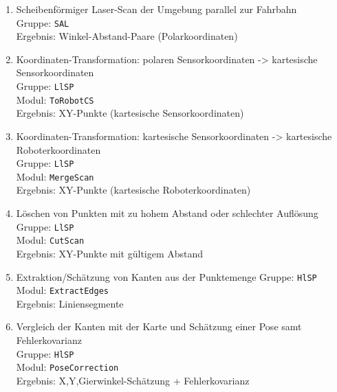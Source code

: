 \begin{enumerate}
  \item Scheibenförmiger Laser-Scan der Umgebung parallel zur Fahrbahn\\
    	Gruppe: \lstinline{SAL}\\
    	Ergebnis: Winkel-Abstand-Paare (Polarkoordinaten)\\
  \item Koordinaten-Transformation: polaren Sensorkoordinaten -> kartesische
  		Sensorkoordinaten\\
  		Gruppe: \lstinline{LlSP}\\
    	Modul: \lstinline{ToRobotCS}\\
    	Ergebnis: XY-Punkte (kartesische Sensorkoordinaten)\\
  \item Koordinaten-Transformation: kartesische Sensorkoordinaten -> kartesische
  		Roboterkoordinaten\\ 
  		Gruppe: \lstinline{LlSP}\\
  		Modul: \lstinline{MergeScan}\\
  		Ergebnis: XY-Punkte (kartesische Roboterkoordinaten)\\
  \item Löschen von Punkten mit zu hohem Abstand oder schlechter Auflösung\\
    	Gruppe: \lstinline{LlSP}\\
    	Modul: \lstinline{CutScan}\\
    	Ergebnis: XY-Punkte mit gültigem Abstand\\
  \item Extraktion/Schätzung von Kanten aus der Punktemenge
    	Gruppe: \lstinline{HlSP}\\
    	Modul: \lstinline{ExtractEdges}\\
    	Ergebnis: Liniensegmente\\
  \item Vergleich der Kanten mit der Karte und Schätzung einer Pose samt
  		Fehlerkovarianz\\ 
  		Gruppe: \lstinline{HlSP}\\
    	Modul: \lstinline{PoseCorrection}\\
    	Ergebnis: X,Y,Gierwinkel-Schätzung + Fehlerkovarianz\\
\end{enumerate}

